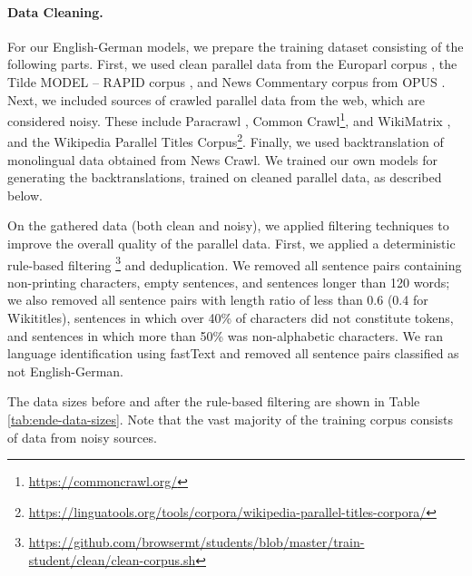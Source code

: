\paragraph{Data Cleaning.} For our English-German models, we prepare the
training dataset consisting of the following parts. First, we used clean
parallel data from the Europarl corpus \citep{koehn2005europarl}, the Tilde
MODEL -- RAPID corpus \citep{rozis-skadins-2017-tilde}, and News Commentary
corpus from OPUS \citep{tiedemann2012opus}. Next, we included sources of
crawled parallel data from the web, which are considered noisy. These include
Paracrawl \citep{espla-etal-2019-paracrawl}, Common
Crawl\footnote{\url{https://commoncrawl.org/}}, and WikiMatrix
\citep{schwenk2019wikimatrix}, and the Wikipedia Parallel Titles
Corpus\footnote{\url{https://linguatools.org/tools/corpora/wikipedia-parallel-titles-corpora/}}. Finally,
we used backtranslation \citep{sennrich-etal-2016-improving} of monolingual
data obtained from News Crawl. We trained our own models for generating the
backtranslations, trained on cleaned parallel data, as described below.

On the gathered data (both clean and noisy), we applied filtering techniques to
improve the overall quality of the parallel data. First, we applied a
deterministic rule-based filtering%
\footnote{\url{https://github.com/browsermt/students/blob/master/train-student/clean/clean-corpus.sh}}
and deduplication. We removed all sentence pairs containing non-printing
characters, empty sentences, and sentences longer than 120 words; we also
removed all sentence pairs with length ratio of less than 0.6 (0.4 for
Wikititles), sentences in which over 40\% of characters did not constitute
tokens, and sentences in which more than 50\% was non-alphabetic characters. We
ran language identification using fastText
\citep{joulin-etal-2017-bag,joulin2016fasttext} and removed all sentence pairs
classified as not English-German.

The data sizes before and after the rule-based filtering are shown in Table
\ref{tab:ende-data-sizes}. Note that the vast majority of the training corpus
consists of data from noisy sources.

